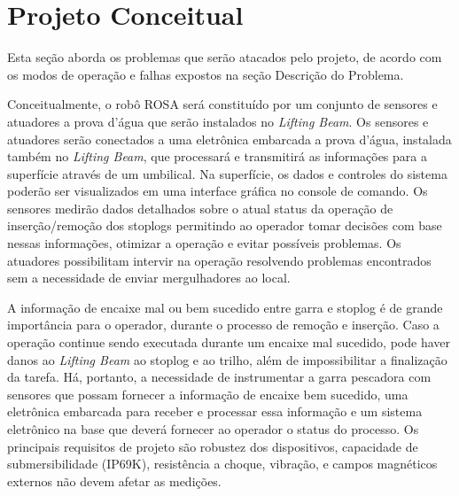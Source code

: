 

\section{Projeto Conceitual}
Esta seção aborda os problemas que serão atacados pelo projeto, de acordo com os
modos de operação e falhas expostos na seção Descrição do Problema.

Conceitualmente, o robô ROSA será constituído por um conjunto de sensores e
atuadores a prova d'água que serão instalados no \emph{Lifting Beam}. Os
sensores e atuadores serão conectados a uma eletrônica embarcada a prova d'água,
instalada também no \emph{Lifting Beam}, que processará e transmitirá as
informações para a superfície através de um umbilical. Na superfície, os dados e
controles do sistema poderão ser visualizados em uma interface gráfica no
console de comando. Os sensores medirão dados detalhados sobre o atual status da
operação de inserção/remoção dos stoplogs permitindo ao operador tomar decisões
com base nessas informações, otimizar a operação e evitar possíveis problemas.
Os atuadores possibilitam intervir na operação resolvendo problemas encontrados
sem a necessidade de enviar mergulhadores ao local.

A informação de encaixe mal ou bem sucedido entre garra e stoplog é de grande
importância para o operador, durante o processo de remoção e inserção. Caso a
operação continue sendo executada durante um encaixe mal sucedido, pode haver
danos ao  \emph{Lifting Beam} ao stoplog e ao trilho, além de impossibilitar a
finalização da tarefa. Há, portanto, a necessidade de instrumentar a garra
pescadora com sensores que possam fornecer a informação de encaixe bem sucedido,
uma eletrônica embarcada para receber e processar essa informação e um sistema
eletrônico na base que deverá fornecer ao operador o status do processo.
Os principais requisitos de projeto são robustez dos dispositivos, capacidade de
submersibilidade (IP69K), resistência a choque, vibração, e campos magnéticos
externos não devem afetar as medições.

